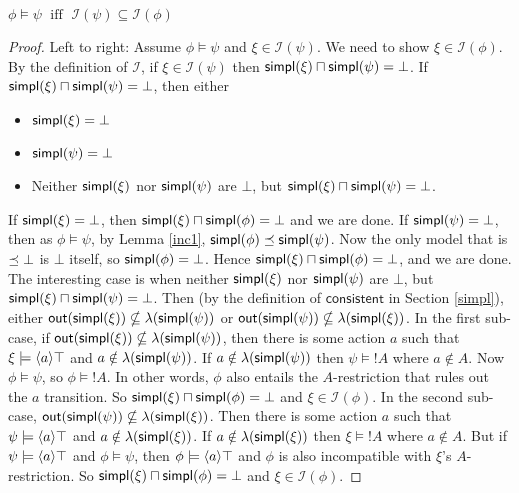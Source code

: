 \begin{theorem}
\label{incompatibilitytheorem}
$\phi \models \psi \; \mbox{ iff } \; \mathcal{I}(\psi) \subseteq \mathcal{I}(\phi)$
\end{theorem}

\begin{proof}

Left to right: Assume $\phi \models \psi$ and $\xi \in \mathcal{I}(\psi)$.  
We need to show $\xi \in \mathcal{I}(\phi)$.
By the definition of $\mathcal{I}$, if $\xi \in \mathcal{I}(\psi)$ then
$\mathsf{simpl}(\xi) \sqcap \mathsf{simpl}(\psi) = \bot$.
If $\mathsf{simpl}(\xi) \sqcap \mathsf{simpl}(\psi) = \bot$, then either
\begin{itemize}
\item $\mathsf{simpl}(\xi) = \bot$
\item $\mathsf{simpl}(\psi) = \bot$
\item Neither $\mathsf{simpl}(\xi)$ nor $\mathsf{simpl}(\psi)$ are $\bot$, but $\mathsf{simpl}(\xi) \sqcap \mathsf{simpl}(\psi) = \bot$.
\end{itemize}
If $\mathsf{simpl}(\xi) = \bot$, then $\mathsf{simpl}(\xi) \sqcap \mathsf{simpl}(\phi) = \bot$ and we are done.
If $\mathsf{simpl}(\psi) = \bot$, then as $\phi \models \psi$, by Lemma \ref{inc1}, $\mathsf{simpl}(\phi) \preceq \mathsf{simpl}(\psi)$.
Now the only model that is $\preceq \bot$ is $\bot$ itself, so $\mathsf{simpl}(\phi) = \bot$. Hence $\mathsf{simpl}(\xi) \sqcap \mathsf{simpl}(\phi) = \bot$, and we are done.
The interesting case is when neither $\mathsf{simpl}(\xi)$ nor $\mathsf{simpl}(\psi)$ are $\bot$, but $\mathsf{simpl}(\xi) \sqcap \mathsf{simpl}(\psi) = \bot$.
Then (by the definition of $\mathsf{consistent}$ in Section \ref{simpl}), either $\mathsf{out}(\mathsf{simpl}(\xi)) \nsubseteq \lambda(\mathsf{simpl}(\psi))$ or $\mathsf{out}(\mathsf{simpl}(\psi)) \nsubseteq \lambda(\mathsf{simpl}(\xi))$.
In the first sub-case, if  $\mathsf{out}(\mathsf{simpl}(\xi)) \nsubseteq \lambda(\mathsf{simpl}(\psi))$, then there is some action $a$ such that $\xi \models \langle a \rangle \top$ and $a \notin \lambda(\mathsf{simpl}(\psi))$.
If $a \notin \lambda(\mathsf{simpl}(\psi))$ then $\psi \models ! A$ where $a \notin A$.
Now $\phi \models \psi$, so $\phi \models ! A$.
In other words, $\phi$ also entails the $A$-restriction that rules out the $a$ transition.
So $\mathsf{simpl}(\xi) \sqcap \mathsf{simpl}(\phi) = \bot$ and $\xi \in \mathcal{I}(\phi)$.
In the second sub-case, $\mathsf{out}(\mathsf{simpl}(\psi)) \nsubseteq \lambda(\mathsf{simpl}(\xi))$.
Then there is some action $a$ such that $\psi \models \langle a \rangle \top$ and $a \notin \lambda(\mathsf{simpl}(\xi))$.
If $a \notin \lambda(\mathsf{simpl}(\xi))$ then $\xi \models ! A$ where $a \notin A$.
But if $\psi \models \langle a \rangle \top$ and $\phi \models \psi$, then $\phi \models \langle a \rangle \top$ and $\phi$ is also incompatible with $\xi$'s $A$-restriction.
So $\mathsf{simpl}(\xi) \sqcap \mathsf{simpl}(\phi) = \bot$ and $\xi \in \mathcal{I}(\phi)$.


\end{proof}
